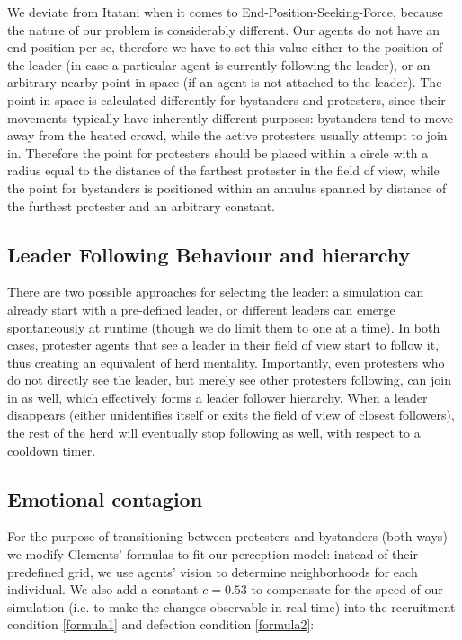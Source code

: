 \documentclass[9pt]{pnas-new}
\begin{document}
\bigskip
We deviate from Itatani \cite{socialcrowdsimulation} when it comes to End-Position-Seeking-Force, because the nature of our problem is considerably different. Our agents do not have an end position per se, therefore we have to set this value either to the position of the leader (in case a particular agent is currently following the leader), or an arbitrary nearby point in space (if an agent is not attached to the leader). The point in space is calculated differently for bystanders and protesters, since their movements typically have inherently different purposes: bystanders tend to move away from the heated crowd, while the active protesters usually attempt to join in. Therefore the point for protesters should be placed within a circle with a radius equal to the distance of the farthest protester in the field of view, while the point for bystanders is positioned within an annulus spanned by distance of the furthest protester and an arbitrary constant. 

\subsection*{Leader Following Behaviour and hierarchy} 

There are two possible approaches for selecting the leader: a simulation can already start with a pre-defined leader, or different leaders can emerge spontaneously at runtime (though we do limit them to one at a time). In both cases, protester agents that see a leader in their field of view start to follow it, thus creating an equivalent of herd mentality. Importantly, even protesters who do not directly see the leader, but merely see other protesters following, can join in as well, which effectively forms a leader follower hierarchy. When a leader disappears (either unidentifies itself or exits the field of view of closest followers), the rest of the herd will eventually stop following as well, with respect to a cooldown timer. 

\subsection*{Emotional contagion}

For the purpose of transitioning between protesters and bystanders (both ways) we modify Clements' formulas to fit our perception model: instead of their predefined grid, we use agents' vision to determine neighborhoods for each individual. We also add a constant $c=0.53$ to compensate for the speed of our simulation (i.e. to make the changes observable in real time) into the recruitment condition \ref{formula1} and defection condition \ref{formula2}:
\end{document}
